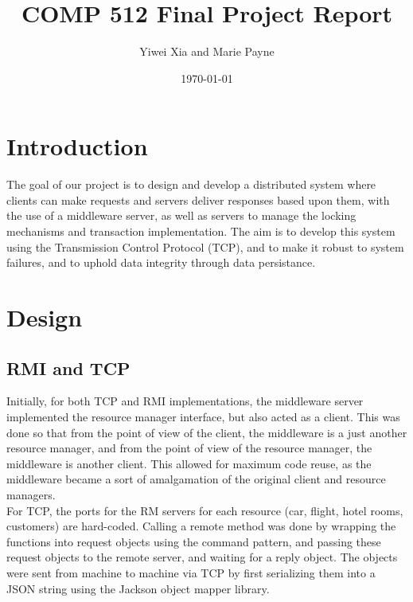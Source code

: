 \documentclass[letterpaper,12pt]{article}
\begin{document}
	
	\title{COMP 512 Final Project Report}
	\author{Yiwei Xia and Marie Payne}
	\date{\today}
	\maketitle
	
	\pagebreak
	
	\section{Introduction}
	
	The goal of our project is to design and develop a distributed system where clients can make requests and servers deliver responses based upon them, with the use of a middleware server, as well as servers to manage the locking mechanisms and transaction implementation. The aim is to develop this system using the Transmission Control Protocol (TCP), and to make it robust to system failures, and to uphold data integrity through data persistance.
	
	
	\section{Design}

	\subsection*{RMI and TCP}  

	Initially, for both TCP and RMI implementations, the middleware server implemented the resource manager interface, but also acted as a client. This was done so that from the point of view of the client, the middleware is a just another resource manager, and from the point of view of the resource manager, the middleware is another client. This allowed for maximum code reuse, as the middleware became a sort of amalgamation of the original client and resource managers.\\

	For TCP, the ports for the RM servers for each resource (car, flight, hotel rooms, customers) are hard-coded. Calling a remote method was done by wrapping the functions into request objects using the command pattern, and passing these request objects to the remote server, and waiting for a reply object. The objects were sent from machine to machine via TCP by first serializing them into a JSON string using the Jackson object mapper library. \\
\end{document}
